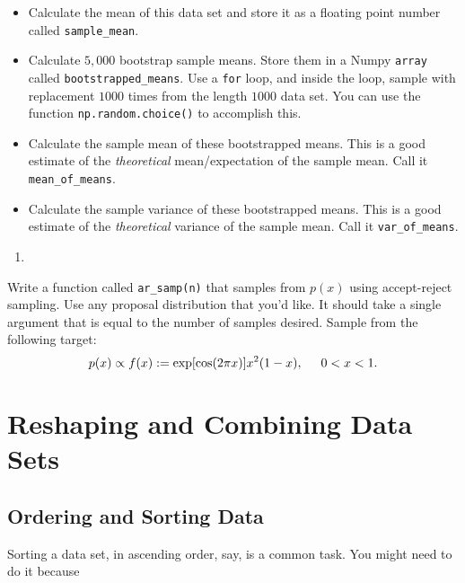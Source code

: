 \documentclass[12pt,krantz2]{krantz}
\providecommand{\tightlist}{%
  \setlength{\itemsep}{0pt}\setlength{\parskip}{0pt}}
\begin{document}
\begin{itemize}
\tightlist
\item
  Calculate the mean of this data set and store it as a floating point number called \texttt{sample\_mean}.
\item
  Calculate \(5,000\) bootstrap sample means. Store them in a Numpy \texttt{array} called \texttt{bootstrapped\_means}. Use a \texttt{for} loop, and inside the loop, sample with replacement \(1000\) times from the length \(1000\) data set. You can use the function \texttt{np.random.choice()} to accomplish this.
\item
  Calculate the sample mean of these bootstrapped means. This is a good estimate of the \emph{theoretical} mean/expectation of the sample mean. Call it \texttt{mean\_of\_means}.
\item
  Calculate the sample variance of these bootstrapped means. This is a good estimate of the \emph{theoretical} variance of the sample mean. Call it \texttt{var\_of\_means}.
\end{itemize}

\begin{enumerate}
\def\labelenumi{\arabic{enumi}.}
\setcounter{enumi}{2}
\item
\end{enumerate}

Write a function called \texttt{ar\_samp(n)} that samples from \(p(x)\) using accept-reject sampling. Use any proposal distribution that you'd like. It should take a single argument that is equal to the number of samples desired. Sample from the following target:
\begin{equation} 
p(x) \propto f(x) := \exp[\cos(2\pi x)] x^2(1-x), \hspace{5mm} 0 < x < 1.
\end{equation}

\hypertarget{reshaping-and-combining-data-sets}{%
\chapter{Reshaping and Combining Data Sets}\label{reshaping-and-combining-data-sets}}

\hypertarget{ordering-and-sorting-data}{%
\section{Ordering and Sorting Data}\label{ordering-and-sorting-data}}

Sorting a data set, in ascending order, say, is a common task. You might need to do it because
\end{document}
